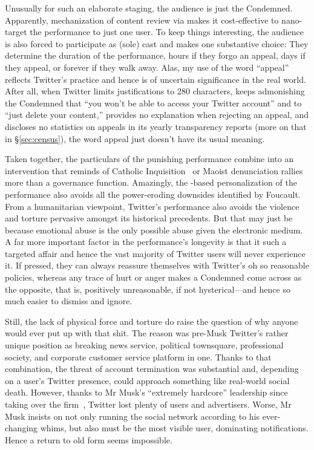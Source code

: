 Unusually for such an elaborate staging, the audience is just the Condemned.
Apparently, mechanization of content review via  makes it cost-effective to
nano-target the performance to just one user. To keep things interesting, the
audience is also forced to participate as (sole) cast and makes one substantive
choice: They determine the duration of the performance, hours if they forgo an
appeal, days if they appeal, or forever if they walk away. Alas, my use of the
word ``appeal'' reflects Twitter's practice and hence is of uncertain
significance in the real world. After all, when Twitter limits justifications to
280 characters, keeps admonishing the Condemned that ``you won't be able to
access your Twitter account'' and to ``just delete your content,'' provides no
explanation when rejecting an appeal, and discloses no statistics on appeals in
its yearly transparency reports (more on that in \S\ref{sec:census}), the word
appeal just doesn't have its usual meaning.

Taken together, the particulars of the punishing performance combine into an
intervention that reminds of Catholic
Inquisition~\cite{Lea1906a,Lea1906b,Lea1906c,Lea1906d} or Maoist denunciation
rallies~\cite{Yang2021} more than a governance function. Amazingly, the
-based personalization of the performance also avoids all the power-eroding
downsides identified by Foucault. From a humanitarian viewpoint, Twitter's
performance also avoids the violence and torture pervasive amongst its
historical precedents. But that may just be because emotional abuse is the only
possible abuse given the electronic medium. A far more important factor in the
performance's longevity is that it such a targeted affair and hence the vast
majority of Twitter users will never experience it. If pressed, they can always
reassure themselves with Twitter's oh so reasonable policies, whereas any trace
of hurt or anger makes a Condemned come across as the opposite, that is,
positively unreasonable, if not hysterical---and hence so much easier to
dismiss and ignore.

Still, the lack of physical force and torture do raise the question of why
anyone would ever put up with that shit. The reason was pre-Musk Twitter's
rather unique position as breaking news service, political townsquare,
professional society, and corporate customer service platform in one. Thanks to
that combination, the threat of account termination was substantial and,
depending on a user's Twitter presence, could approach something like real-world
social death. However, thanks to Mr Musk's ``extremely hardcore'' leadership
since taking over the firm~\cite{SchifferNewtonea2023}, Twitter lost plenty of
users and advertisers. Worse, Mr Musk insists on not only running the social
network according to his ever-changing whims, but also must be the most visible
user, dominating notifications. Hence a return to old form seems impossible.


